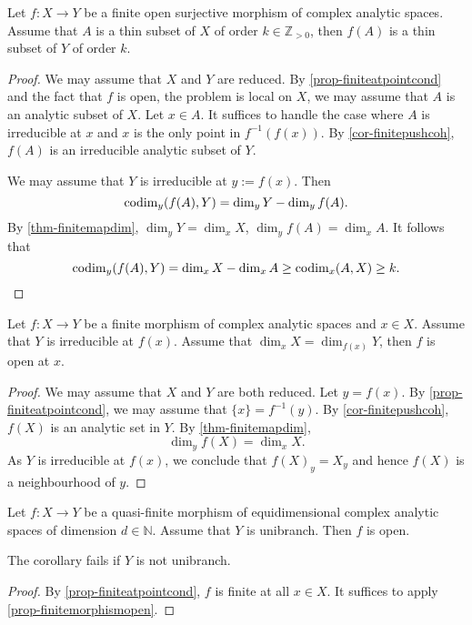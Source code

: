 \begin{corollary}\label{cor-finiteopensurjthinsetpre}
    Let $f:X\rightarrow Y$ be a finite open surjective morphism of complex analytic spaces. Assume that $A$ is a thin subset of $X$ of order $k\in \mathbb{Z}_{>0}$, then $f(A)$ is a thin subset of $Y$ of order $k$.
\end{corollary}
\begin{proof}
    We may assume that $X$ and $Y$ are reduced.
    By \cref{prop-finiteatpointcond} and the fact that $f$ is open, the problem is local on $X$, we may assume that $A$ is an analytic subset of $X$. Let $x\in A$. It suffices to handle the case where $A$ is irreducible at $x$ and $x$ is the only point in $f^{-1}(f(x))$.
    By \cref{cor-finitepushcoh}, $f(A)$ is an irreducible analytic subset of $Y$.

    We may assume that $Y$ is irreducible at $y:=f(x)$. Then
    \[
        \operatorname{codim}_y(f(A),Y)=\dim_y Y-\dim_y f(A).  
    \]
    By \cref{thm-finitemapdim}, $\dim_y Y=\dim_x X$, $\dim_y f(A)=\dim_x A$. It follows that
    \[
        \operatorname{codim}_y(f(A),Y)=\dim_x X-\dim_x A  \geq \operatorname{codim}_x(A,X)\geq k.
    \]
\end{proof}

\begin{proposition}\label{prop-finitemorphismopen}
    Let $f:X\rightarrow Y$ be a finite morphism of complex analytic spaces and $x\in X$. Assume that $Y$ is irreducible at $f(x)$. Assume that $\dim_x X=\dim_{f(x)}Y$, then $f$ is open at $x$.
\end{proposition}
\begin{proof}
    We may assume that $X$ and $Y$ are both reduced. Let $y=f(x)$. By \cref{prop-finiteatpointcond}, we may assume that $\{x\}=f^{-1}(y)$. By \cref{cor-finitepushcoh}, $f(X)$ is an analytic set in $Y$. By \cref{thm-finitemapdim},
    \[
        \dim_y f(X)=\dim_x X.  
    \]
    As $Y$ is irreducible at $f(x)$, we conclude that $f(X)_y=X_y$ and hence $f(X)$ is a neighbourhood of $y$.
\end{proof}
\begin{corollary}\label{cor-quasifiniemoropen}
    Let $f:X\rightarrow Y$ be a quasi-finite morphism of equidimensional complex analytic spaces of dimension $d\in \mathbb{N}$. Assume that $Y$ is unibranch. Then $f$ is open. 
\end{corollary}
The corollary fails if $Y$ is not unibranch.
\begin{proof}
    By \cref{prop-finiteatpointcond}, $f$ is finite at all $x\in X$. It suffices to apply \cref{prop-finitemorphismopen}.
\end{proof}


